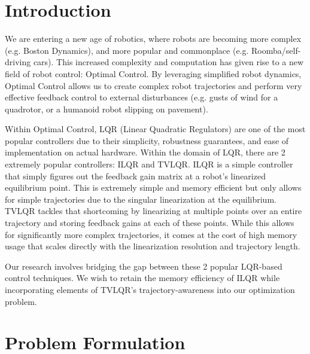 \documentclass[11pt]{article}
\begin{document}
    \headingsshared
    
    \section{Introduction}
    We are entering a new age of robotics, where robots are becoming more complex (e.g. Boston Dynamics), and more popular and commonplace (e.g. Roomba/self-driving cars). This increased complexity and computation has given rise to a new field of robot control: Optimal Control. By leveraging simplified robot dynamics, Optimal Control allows us to create complex robot trajectories and perform very effective feedback control to external disturbances (e.g. gusts of wind for a quadrotor, or a humanoid robot slipping on pavement). 
    
    Within Optimal Control, LQR (Linear Quadratic Regulators) are one of the most popular controllers due to their simplicity, robustness guarantees, and ease of implementation on actual hardware. Within the domain of LQR, there are 2 extremely popular controllers: ILQR and TVLQR. ILQR is a simple controller that simply figures out the feedback gain matrix at a robot’s linearized equilibrium point. This is extremely simple and memory efficient but only allows for simple trajectories due to the singular linearization at the equilibrium. TVLQR tackles that shortcoming by linearizing at multiple points over an entire trajectory and storing feedback gains at each of these points. While this allows for significantly more complex trajectories, it comes at the cost of high memory usage that scales directly with the linearization resolution and trajectory length. \cite{underactuated}
    
    Our research involves bridging the gap between these 2 popular LQR-based control techniques. We wish to retain the memory efficiency of ILQR while incorporating elements of TVLQR’s trajectory-awareness into our optimization problem.
    
    
    \section{Problem Formulation} \label{sec:prob}
\end{document}
